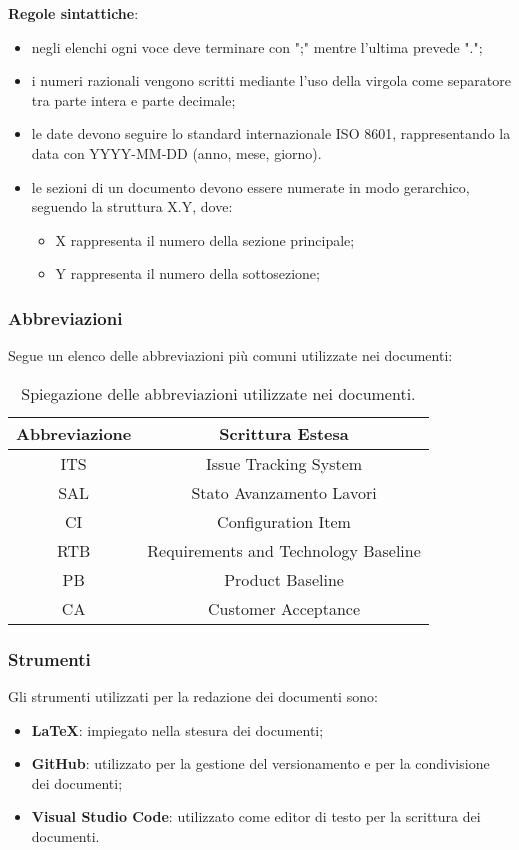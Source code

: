 \newpage
\textbf{Regole sintattiche}:
\begin{itemize}
	\item negli elenchi ogni voce deve terminare con ";" mentre l'ultima prevede ".";
	\item i numeri razionali vengono scritti mediante l'uso della virgola come separatore tra parte intera e parte decimale;
	\item le date devono seguire lo standard internazionale ISO 8601, rappresentando la data con YYYY-MM-DD (anno, mese, giorno).
	\item le sezioni di un documento devono essere numerate in modo gerarchico, seguendo la struttura X.Y, dove:
	      \begin{itemize}
		      \item X rappresenta il numero della sezione principale;
		      \item Y rappresenta il numero della sottosezione;
	      \end{itemize}
\end{itemize}

\subsubsection{Abbreviazioni}
Segue un elenco delle abbreviazioni più comuni utilizzate nei documenti:
\begin{table}[!h]
	\centering
	\begin{tabular}{|c|c|}
		\hline
		\textbf{Abbreviazione} & \textbf{Scrittura Estesa}            \\
		\hline
		ITS                    & Issue Tracking System                \\
		SAL                    & Stato Avanzamento Lavori             \\
		CI                     & Configuration Item                   \\
		RTB                    & Requirements and Technology Baseline \\
		PB                     & Product Baseline                     \\
		CA                     & Customer Acceptance                  \\
		\hline
	\end{tabular}
	\caption{Spiegazione delle abbreviazioni utilizzate nei documenti.}
	\label{tab:1}
\end{table}

\subsubsection{Strumenti}
Gli strumenti utilizzati per la redazione dei documenti sono:
\begin{itemize}
	\item \textbf{LaTeX}: impiegato nella stesura dei documenti;
	\item \textbf{GitHub}: utilizzato per la gestione del versionamento e per la condivisione dei documenti;
	\item \textbf{Visual Studio Code}: utilizzato come editor di testo per la scrittura dei documenti.
\end{itemize}

